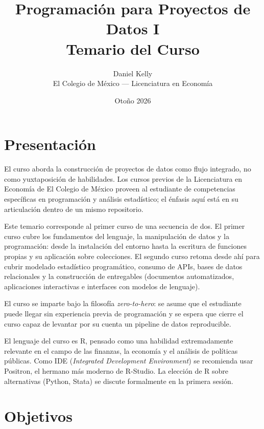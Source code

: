 \documentclass[11pt,letterpaper]{article}
\title{\color{main}\textbf{Programación para Proyectos de Datos I}\\[0.3em]
       \large\color{subtitle}Temario del Curso}
\author{Daniel Kelly\\
        \small El Colegio de México --- Licenciatura en Economía}
\date{Otoño 2026}
\newcommand{\blue}[1]{{\color{cerulean}#1}}
\newcommand{\orange}[1]{{\color{redorange}#1}}
\begin{document}
\maketitle

\section{Presentación}

El curso aborda la construcción de proyectos de datos como flujo integrado, no como yuxtaposición de habilidades. Los cursos previos de la Licenciatura en Economía de El Colegio de México proveen al estudiante de competencias específicas en programación y análisis estadístico; el énfasis aquí está en su articulación dentro de un mismo repositorio.

Este temario corresponde al \blue{primer curso} de una secuencia de dos. El primer curso cubre los fundamentos del lenguaje, la manipulación de datos y la programación: desde la instalación del entorno hasta la escritura de funciones propias y su aplicación sobre colecciones. El \orange{segundo curso} retoma desde ahí para cubrir modelado estadístico programático, consumo de APIs, bases de datos relacionales y la construcción de entregables (documentos automatizados, aplicaciones interactivas e interfaces con modelos de lenguaje).

El curso se imparte bajo la filosofía \textit{zero-to-hero}: se asume que el estudiante puede llegar sin experiencia previa de programación y se espera que cierre el curso capaz de levantar por su cuenta un pipeline de datos reproducible.

El lenguaje del curso es R, pensado como una habilidad extremadamente relevante en el campo de las finanzas, la economía y el análisis de políticas públicas. Como IDE (\textit{Integrated Development Environment}) se recomienda usar Positron, el hermano más moderno de R-Studio. La elección de R sobre alternativas (Python, Stata) se discute formalmente en la primera sesión.

\section{Objetivos}
\end{document}
